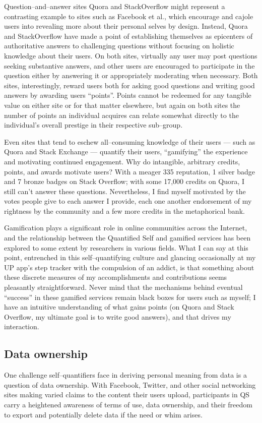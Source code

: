 \documentclass{article}
\begin{document}
Question--and--answer sites Quora and StackOverflow might represent a contrasting example to sites such as Facebook et al.,
which encourage and cajole users into revealing more about their personal selves by design.
Instead,
Quora and StackOverflow have made a point of establishing themselves as epicenters of authoritative answers to challenging questions without focusing on holistic knowledge about their users.
On both sites,
virtually any user may post questions seeking substantive answers,
and other users are encouraged to participate in the question either by answering it or appropriately moderating when necessary.
Both sites,
interestingly,
reward users both for asking good questions and writing good answers by awarding users ``points''.
Points cannot be redeemed for any tangible value on either site or for that matter elsewhere,
but again on both sites the number of points an individual acquires can relate somewhat directly to the individual's overall prestige in their respective sub--group.

Even sites that tend to eschew all--consuming knowledge of their users
--- such as Quora and Stack Exchange ---
quantify their users,
``gamifying'' the experience and motivating continued engagement.
Why do intangible,
arbitrary credits,
points,
and awards motivate users? With a meager 335 reputation,
1 silver badge and 7 bronze badges on Stack Overflow;
with some 17,000 credits on Quora,
I still can't answer these questions.
Nevertheless,
I find myself motivated by the votes people give to each answer I provide,
each one another endorsement of my rightness by the community and a few more credits in the metaphorical bank.

Gamification plays a significant role in online communities across the Internet,
and the relationship between the Quantified Self and gamified services has been explored to some extent by researchers in various fields.
What I can say at this point,
entrenched in this self--quantifying culture and glancing occasionally at my UP app's step tracker with the compulsion of an addict,
is that something about these discrete measures of my accomplishments and contributions seems pleasantly straightforward.
Never mind that the mechanisms behind eventual ``success'' in these gamified services remain black boxes for users such as myself;
I have an intuitive understanding of what gains points (on Quora and Stack Overflow,
my ultimate goal is to write good answers),
and that drives my interaction.

\subsection*{Data ownership}
One challenge self--quantifiers face in deriving personal meaning from data is a question of data ownership.
With Facebook,
Twitter,
and other social networking sites making varied claims to the content their users upload,
participants in QS carry a heightened awareness of terms of use,
data ownership,
and their freedom to export and potentially delete data if the need or whim arises.
\end{document}
